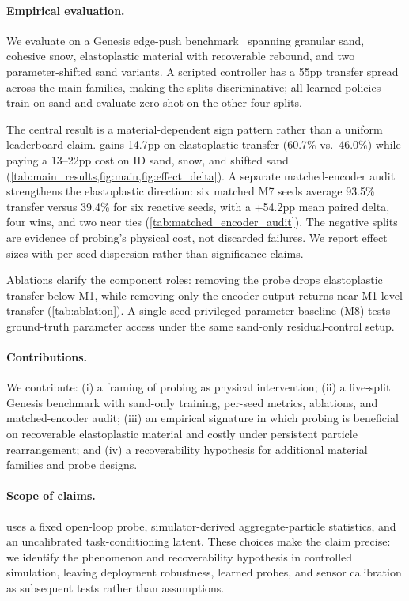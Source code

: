 \paragraph{Empirical evaluation.}
We evaluate \PTA{} on a Genesis edge-push benchmark~\cite{genesis2024} spanning granular sand, cohesive snow, elastoplastic material with recoverable rebound, and two parameter-shifted sand variants. A scripted controller has a 55pp transfer spread across the main families, making the splits discriminative; all learned policies train on sand and evaluate zero-shot on the other four splits.

The central result is a material-dependent sign pattern rather than a uniform leaderboard claim. \PTA{} gains 14.7pp on elastoplastic transfer (60.7\% vs.\ 46.0\%) while paying a 13--22pp cost on ID sand, snow, and shifted sand (\cref{tab:main_results,fig:main,fig:effect_delta}). A separate matched-encoder audit strengthens the elastoplastic direction: six matched M7 seeds average 93.5\% transfer versus 39.4\% for six reactive seeds, with a +54.2pp mean paired delta, four wins, and two near ties (\cref{tab:matched_encoder_audit}). The negative splits are evidence of probing's physical cost, not discarded failures. We report effect sizes with per-seed dispersion rather than significance claims.

Ablations clarify the component roles: removing the probe drops elastoplastic transfer below M1, while removing only the encoder output returns near M1-level transfer (\cref{tab:ablation}). A single-seed privileged-parameter baseline (M8) tests ground-truth parameter access under the same sand-only residual-control setup.

\paragraph{Contributions.}
We contribute: (i) a framing of probing as physical intervention; (ii) a five-split Genesis benchmark with sand-only training, per-seed metrics, ablations, and matched-encoder audit; (iii) an empirical signature in which probing is beneficial on recoverable elastoplastic material and costly under persistent particle rearrangement; and (iv) a recoverability hypothesis for additional material families and probe designs.

\paragraph{Scope of claims.}
\PTA{} uses a fixed open-loop probe, simulator-derived aggregate-particle statistics, and an uncalibrated task-conditioning latent. These choices make the claim precise: we identify the phenomenon and recoverability hypothesis in controlled simulation, leaving deployment robustness, learned probes, and sensor calibration as subsequent tests rather than assumptions.
